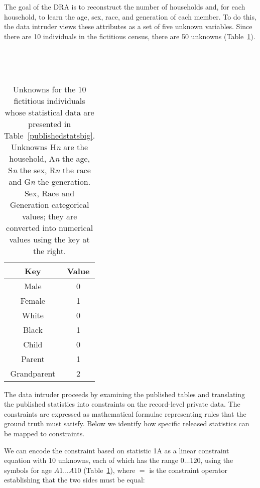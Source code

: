 \documentclass[runningheads]{llncs}
\begin{document}
The goal of the DRA is to reconstruct the number of households and,
for each household, to learn the age, sex, race, and generation of
each member. To do this, the data intruder views these attributes as a set of five
unknown variables. Since there are 10 individuals in
the fictitious census, there are 50 unknowns (Table~\ref{50unknowns}).

\begin{table}
\caption{Unknowns for the 10 fictitious individuals whose statistical
  data are presented in Table~\ref{publishedstatsbig}. Unknowns
  H\textit{n} are the household, A\textit{n} the age, S\textit{n} the
  sex, R\textit{n} the race and G\textit{n} the generation. Sex, Race
  and Generation categorical values; they are converted into numerical
  values using the key at the right.}\label{50unknowns}
\begin{minipage}[t]{.6\textwidth}
~\\[0pt]                        %
  
\end{minipage}
\hfill
\begin{minipage}[t]{.35\textwidth}
~\\[0pt]                        %
  \begin{tabular}{c|c}
  Key & Value \\
  \hline
  \hline
  Male & 0 \\
  Female & 1 \\
  \hline
  White & 0 \\
  Black & 1 \\
  \hline
  Child & 0 \\
  Parent & 1 \\
  Grandparent & 2 \\
  \hline
  \end{tabular}
\end{minipage}
\end{table}

The data intruder proceeds by examining the published tables and
translating the published statistics into constraints on the 
record-level private
data. The constraints are expressed as mathematical formulae
representing rules that the ground truth must satisfy. Below we
identify how specific released statistics can be mapped to
constraints.

We can encode the constraint based on statistic 1A as a linear
constraint equation with 10 unknowns, each of which has the range
$0\ldots120$, using the symbols for age $A1...A10$
(Table~\ref{50unknowns}), where $=$ is the constraint operator
establishing that the two sides must be equal:
\end{document}

